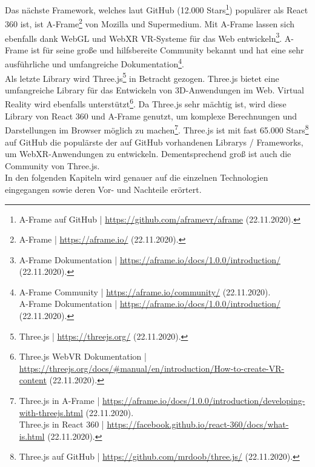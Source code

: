 \documentclass[a4paper,12pt,oneside]{article}
\begin{document}
      Das nächste Framework, welches laut GitHub (12.000 Stars\footnote{A-Frame auf GitHub | \url{https://github.com/aframevr/aframe} (22.11.2020).}) 
      populärer als React 360 ist, ist A-Frame\footnote{A-Frame | \url{https://aframe.io/} (22.11.2020).}
      von Mozilla und Supermedium. Mit A-Frame lassen sich ebenfalls dank
      WebGL und WebXR VR-Systeme für das Web entwickeln\footnote{A-Frame Dokumentation | \url{https://aframe.io/docs/1.0.0/introduction/} (22.11.2020).}.
      A-Frame ist für seine große und
      hilfsbereite Community bekannt und hat eine sehr ausführliche und umfangreiche
      Dokumentation\footnote{A-Frame Community | \url{https://aframe.io/community/} (22.11.2020).\\A-Frame Dokumentation | \url{https://aframe.io/docs/1.0.0/introduction/} (22.11.2020).}.\\
      Als letzte Library wird Three.js\footnote{Three.js | \url{https://threejs.org/} (22.11.2020).}
      in Betracht gezogen. Three.js bietet eine umfangreiche
      Library für das Entwickeln von 3D-Anwendungen im Web. Virtual Reality wird ebenfalls
      unterstützt\footnote{Three.js WebVR Dokumentation | \url{https://threejs.org/docs/\#manual/en/introduction/How-to-create-VR-content} (22.11.2020).}.
      Da Three.js sehr mächtig ist, wird diese Library von React 360
      und A-Frame genutzt, um komplexe Berechnungen und Darstellungen 
      im Browser möglich zu machen\footnote{Three.js in A-Frame | \url{https://aframe.io/docs/1.0.0/introduction/developing-with-threejs.html} (22.11.2020).\\Three.js in React 360 | \url{https://facebook.github.io/react-360/docs/what-is.html} (22.11.2020).}.
      Three.js ist mit fast 65.000 Stars\footnote{Three.js auf GitHub | \url{https://github.com/mrdoob/three.js/} (22.11.2020).}
      auf GitHub die populärste der auf GitHub 
      vorhandenen Librarys / Frameworks, um WebXR-Anwendungen zu entwickeln. 
      Dementsprechend groß ist auch die Community von Three.js. \\
      In den folgenden Kapiteln wird genauer auf die einzelnen Technologien 
      eingegangen sowie deren Vor- und Nachteile erörtert.
\end{document}
